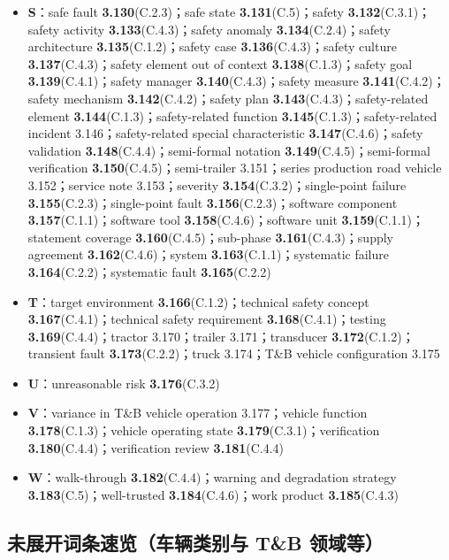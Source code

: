 \begin{itemize}
\item \textbf{S}：safe fault \textbf{3.130}(C.2.3)；safe state \textbf{3.131}(C.5)；safety \textbf{3.132}(C.3.1)；safety activity \textbf{3.133}(C.4.3)；safety anomaly \textbf{3.134}(C.2.4)；safety architecture \textbf{3.135}(C.1.2)；safety case \textbf{3.136}(C.4.3)；safety culture \textbf{3.137}(C.4.3)；safety element out of context \textbf{3.138}(C.1.3)；safety goal \textbf{3.139}(C.4.1)；safety manager \textbf{3.140}(C.4.3)；safety measure \textbf{3.141}(C.4.2)；safety mechanism \textbf{3.142}(C.4.2)；safety plan \textbf{3.143}(C.4.3)；safety-related element \textbf{3.144}(C.1.3)；safety-related function \textbf{3.145}(C.1.3)；safety-related incident 3.146；safety-related special characteristic \textbf{3.147}(C.4.6)；safety validation \textbf{3.148}(C.4.4)；semi-formal notation \textbf{3.149}(C.4.5)；semi-formal verification \textbf{3.150}(C.4.5)；semi-trailer 3.151；series production road vehicle 3.152；service note 3.153；severity \textbf{3.154}(C.3.2)；single-point failure \textbf{3.155}(C.2.3)；single-point fault \textbf{3.156}(C.2.3)；software component \textbf{3.157}(C.1.1)；software tool \textbf{3.158}(C.4.6)；software unit \textbf{3.159}(C.1.1)；statement coverage \textbf{3.160}(C.4.5)；sub-phase \textbf{3.161}(C.4.3)；supply agreement \textbf{3.162}(C.4.6)；system \textbf{3.163}(C.1.1)；systematic failure \textbf{3.164}(C.2.2)；systematic fault \textbf{3.165}(C.2.2)
\item \textbf{T}：target environment \textbf{3.166}(C.1.2)；technical safety concept \textbf{3.167}(C.4.1)；technical safety requirement \textbf{3.168}(C.4.1)；testing \textbf{3.169}(C.4.4)；tractor 3.170；trailer 3.171；transducer \textbf{3.172}(C.1.2)；transient fault \textbf{3.173}(C.2.2)；truck 3.174；T\&B vehicle configuration 3.175
\item \textbf{U}：unreasonable risk \textbf{3.176}(C.3.2)
\item \textbf{V}：variance in T\&B vehicle operation 3.177；vehicle function \textbf{3.178}(C.1.3)；vehicle operating state \textbf{3.179}(C.3.1)；verification \textbf{3.180}(C.4.4)；verification review \textbf{3.181}(C.4.4)
\item \textbf{W}：walk-through \textbf{3.182}(C.4.4)；warning and degradation strategy \textbf{3.183}(C.5)；well-trusted \textbf{3.184}(C.4.6)；work product \textbf{3.185}(C.4.3)
\end{itemize}

\subsection{未展开词条速览（车辆类别与 T\&B 领域等）}

